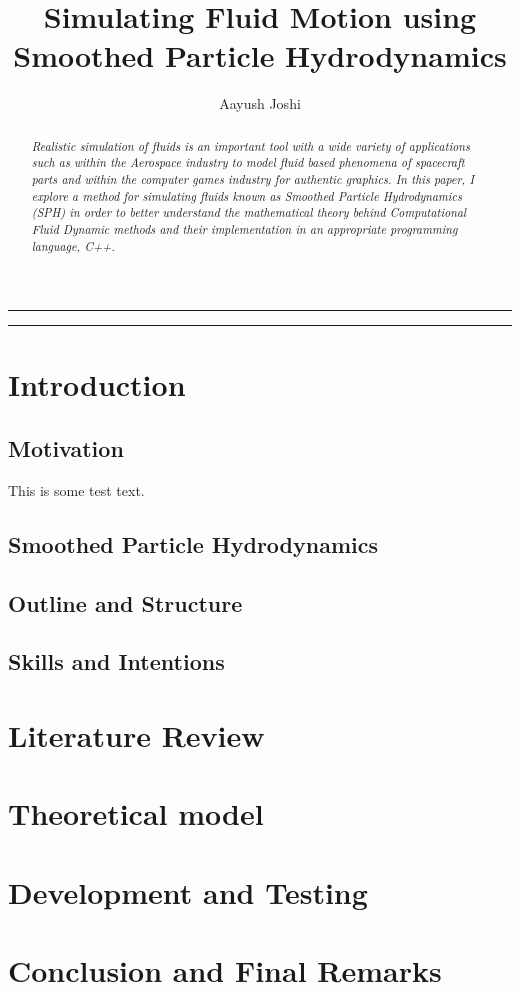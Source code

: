 \documentclass[a4paper,11pt]{article}
\title{\textbf{Simulating Fluid Motion using Smoothed Particle Hydrodynamics}}
\author{Aayush Joshi}
\date{}
\begin{document}
\maketitle

\par\noindent\rule{\textwidth}{0.3pt}

\begin{abstract}
\noindent \textit{Realistic simulation of fluids is an important tool with a wide variety of applications such as within the Aerospace industry to model fluid based phenomena of spacecraft parts and within the computer games industry for authentic graphics. In this paper, I explore a method for simulating fluids known as Smoothed Particle Hydrodynamics (SPH) in order to better understand the mathematical theory behind Computational Fluid Dynamic methods and their implementation in an appropriate programming language, C++.}
\end{abstract}

\par\noindent\rule{\textwidth}{0.3pt}
\tableofcontents
\newpage

\section{Introduction}
\subsection{Motivation}
This is some test text. \cite{muller} \cite{koschier}
\subsection{Smoothed Particle Hydrodynamics}
\subsection{Outline and Structure}
\subsection{Skills and Intentions}

\section{Literature Review}
\section{Theoretical model}
\section{Development and Testing}
\section{Conclusion and Final Remarks}

\newpage


\end{document}
